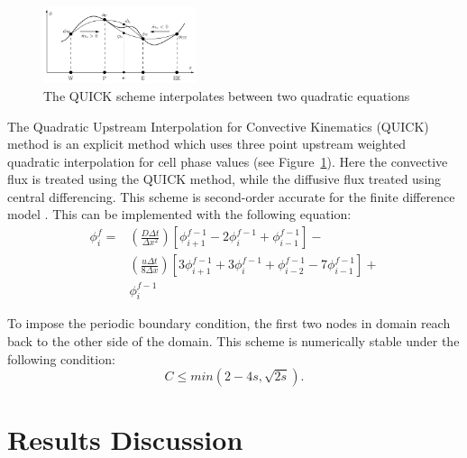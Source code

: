 \documentclass[twocolumn,10pt]{asme2ej}
\begin{document}
\begin{figure}[b]
\begin{center}
\includegraphics[width=0.4\textwidth]{figure/QUICK.png}
\caption{The QUICK scheme interpolates between two quadratic equations \cite{analytic_citation}}
\label{QUICK_scheme}
\end{center}
\end{figure}

The Quadratic Upstream Interpolation for Convective Kinematics (QUICK) method is an explicit method which uses three point upstream weighted quadratic interpolation for cell phase values (see Figure~\ref{QUICK_scheme}). Here the convective flux is treated using the QUICK method, while the diffusive flux treated using central differencing. This scheme is second-order accurate for the finite difference model \cite{chen1992advection}. This can be implemented with the following equation:
\begin{equation}
\label{quick_eqn}
\begin{split}
\phi_i ^f = & \left( \frac{D \Delta t}{\Delta x^2} \right) \left[ \phi_{i+1} ^{f-1} - 2 \phi_{i} ^{f-1} + \phi_{i-1} ^{f-1} \right] - \\
            & \left( \frac{u \Delta t}{8 \Delta x} \right) \left[ 3 \phi_{i+1} ^{f-1}  + 3 \phi_{i} ^{f-1}  + \phi_{i-2} ^{f-1} - 7 \phi_{i-1} ^{f-1} \right] + \\
            & \phi_i ^{f-1}
\end{split}
\end{equation}

To impose the periodic boundary condition, the first two nodes in domain reach back to the other side of the domain. This scheme is numerically stable under the following condition:
\begin{equation}
\label{QUICK_stability}
C \leq min(2 - 4 s, \sqrt{2s}).
\end{equation}

\section{Results Discussion}
\end{document}

